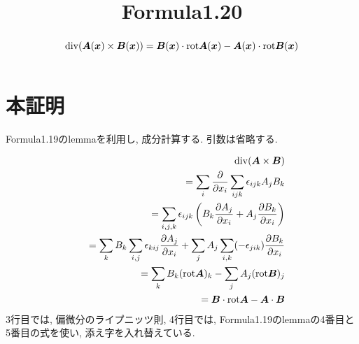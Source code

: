 \documentclass{jsarticle}
\title{Formula1.20}
\newcommand*{\mbold}[1]{\mbox{\boldmath $#1$}}
\newcommand*{\divg}{{\rm div}}
\newcommand*{\rot}{{\rm rot}}
\begin{document}
\maketitle

\begin{abstract}
  \begin{equation}
    \divg(\mbold{A}(\mbold{x}) \times \mbold{B}(\mbold{x})) = \mbold{B}(\mbold{x}) \cdot \rot \mbold{A}(\mbold{x}) - \mbold{A}(\mbold{x}) \cdot \rot\mbold{B}(\mbold{x})
  \end{equation}
\end{abstract}

\section*{本証明}
Formula1.19のlemmaを利用し, 成分計算する. 引数は省略する. 

\begin{eqnarray}
  && \divg(\mbold{A} \times \mbold{B}) \nonumber \\
  && = \sum_i \frac{\partial}{\partial x_i}\sum_{ijk}\epsilon_{ijk}A_j B_k \nonumber \\
  && = \sum_{i, j, k}\epsilon_{ijk} \left( B_k \frac{\partial A_j}{\partial x_i} + A_j \frac{\partial B_k}{\partial x_i} \right) \nonumber \\
  && = \sum_k B_k \sum_{i, j} \epsilon_{kij} \frac{\partial A_j}{\partial x_i} + \sum_j A_j \sum_{i, k}(-\epsilon_{jik})\frac{\partial B_k}{\partial x_i} \nonumber \\
  && = \sum_k B_k (\rot\mbold{A})_k - \sum_j A_j (\rot\mbold{B})_j \nonumber \\
  && = \mbold{B} \cdot \rot\mbold{A} - \mbold{A} \cdot \mbold{B}
\end{eqnarray}
3行目では, 偏微分のライプニッツ則, 4行目では, Formula1.19のlemmaの4番目と5番目の式を使い, 添え字を入れ替えている. 
\end{document}
